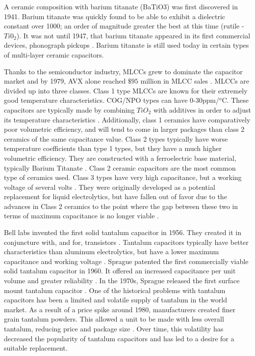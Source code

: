 A ceramic composition with barium titanate (BaTiO3) was first discovered in 1941. Barium titanate was quickly found to be able to exhibit a dielectric constant over 1000; an order of magnitude greater the best at this time (rutile - $Ti0_2$). It was not until 1947, that barium titanate appeared in its first commercial devices, phonograph pickups \cite{piezCer}\cite{hist_cerFilt}\cite[Ch 3 Sec III]{cerMaterials}. Barium titanate is still used today in certain types of multi-layer ceramic capacitors.

Thanks to the semiconductor industry, MLCCs grew to dominate the capacitor market and by 1979, AVX alone reached $\$95$ million in MLCC sales \cite{avx_hist}.
MLCCs are divided up into three classes. Class 1 type MLCCs are known for their extremely good temperature characteristics. COG/NPO types can have 0-30ppm/$^o$C. These capacitors are typically made by combining $TiO_2$ with additives in order to adjust its temperature characteristics \cite{intro_cerCaps}. Additionally, class 1 ceramics have comparatively poor volumetric efficiency, and will tend to come in larger packages than class 2 ceramics of the same capacitance value. Class 2 types typically have worse temperature coefficients than type 1 types, but they have a much higher volumetric efficiency. They are constructed with a ferroelectric base material, typically Barium Titanate \cite{intro_cerCaps}. Class 2 ceramic capacitors are the most common type of ceramics used. Class 3 types have very high capacitance, but a working voltage of several volts \cite{hist_cerFilt}\cite[Ch 3 Sec VI]{cerMaterials}\cite{atCer_tempco}. They were originally developed as a potential replacement for liquid electrolytics, but have fallen out of favor due to the advances in Class 2 ceramics to the point where the gap between these two in terms of maximum capacitance is no longer viable \cite{wiki_cer}.

Bell labs invented the first solid tantalum capacitor in 1956. They created it in conjuncture with, and for, transistors \cite[f.~56-64]{dumInv}. Tantalum capacitors typically have better characteristics than aluminum electrolytics, but have a lower maximum capacitance and working voltage \cite{learn_caps}.
Sprague patented the first commercially viable solid tantalum capacitor in 1960. It offered an increased capacitance per unit volume and greater reliability \cite{charTant}. In the 1970s, Sprague released the first surface mount tantalum capacitor \cite{spragueHist}.
One of the historical problems with tantalum capacitors has been a limited and volatile supply of tantalum in the world market. 
As a result of a price spike around 1980, manufacturers created finer grain tantalum powders. This allowed a unit to be made with less overall tantalum, reducing price and package size \cite[ch~3.1]{tantMis}.
Over time, this volatility has decreased the popularity of tantalum capacitors and has led to a desire for a suitable replacement.

